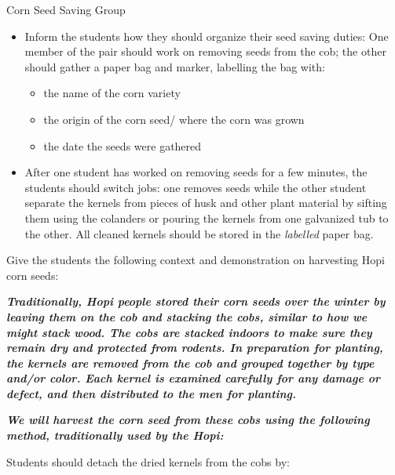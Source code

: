 \documentclass[12pt,]{article}
\providecommand{\tightlist}{%
  \setlength{\itemsep}{0pt}\setlength{\parskip}{0pt}}
\begin{document}
{Corn Seed Saving Group}

\begin{itemize}
\tightlist
\item
  Inform the students how they should organize their seed saving duties: One member of the pair should work on removing seeds from the cob; the other should gather a paper bag and marker, labelling the bag with:

  \begin{itemize}
  \tightlist
  \item
    the name of the corn variety
  \item
    the origin of the corn seed/ where the corn was grown
  \item
    the date the seeds were gathered
  \end{itemize}
\item
  After one student has worked on removing seeds for a few minutes, the students should switch jobs: one removes seeds while the other student separate the kernels from pieces of husk and other plant material by sifting them using the colanders or pouring the kernels from one galvanized tub to the other. All cleaned kernels should be stored in the \emph{labelled} paper bag.
\end{itemize}

Give the students the following context and demonstration on harvesting Hopi corn seeds:

\textbf{\emph{Traditionally, Hopi people stored their corn seeds over the winter by leaving them on the cob and stacking the cobs, similar to how we might stack wood. The cobs are stacked indoors to make sure they remain dry and protected from rodents. In preparation for planting, the kernels are removed from the cob and grouped together by type and/or color. Each kernel is examined carefully for any damage or defect, and then distributed to the men for planting. }}

\textbf{\emph{We will harvest the corn seed from these cobs using the following method, traditionally used by the Hopi:}}

Students should detach the dried kernels from the cobs by:
\end{document}
